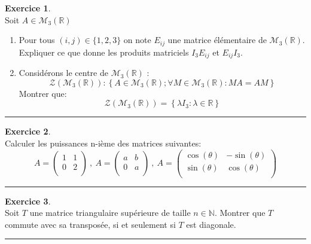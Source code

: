 \documentclass[a4paper,10pt]{article}
\theoremstyle{definition}
\theoremstyle{definition}
\newtheorem{exo}{Exercice}
\newcommand{\R}{\mathbb{R}}
\newcommand{\N}{\mathbb{N}}
\begin{document}
\begin{minipage}{1\linewidth}
\begin{minipage}[t]{0.48\linewidth}
\end{minipage}	
\hfill\vrule\hfill
\begin{minipage}[t]{0.48\linewidth}
\raggedright

\begin{exo}\quad\\
Soit  $A\in\mathcal{M}_{3}\left(\R\right)$ 
\begin{enumerate}
\item Pour tous $(i,j)\in\{1,2,3\}$ on note $E_{ij}$ une matrice élémentaire de $\mathcal{M}_{3}\left(\R\right)$. Expliquer ce que donne les produits matriciels $ I_3E_{ij}$ et $E_{ij}I_3$. 
\item Considérons le centre de $\mathcal{M}_{3}\left(\R\right)$ :
 $$ \mathcal{Z}\left(\mathcal{M}_{3}\left(\R\right)\right) : \left\{A\in\mathcal{M}_{3}\left(\R\right); \forall M\in\mathcal{M}_{3}\left(\R\right)  : MA  = AM \right \}$$
 Montrer que: 
 $$\mathcal{Z}\left(\mathcal{M}_{3}\left(\R\right)\right) = \left\{\lambda I_3 : \lambda\in\R \right \}$$
 
\end{enumerate}
\centering
\rule{1\linewidth}{0.6pt}
\end{exo}

\begin{exo}\quad\\
Calculer les puissances n-ième des matrices suivantes: $$A  =  \begin{pmatrix}
1 & 1 \\
0 &  2\\

\end{pmatrix} \ , \ A  =  \begin{pmatrix}
a & b \\
0 &  a\\

\end{pmatrix}  \ , \ A  =  \begin{pmatrix}
\cos(\theta) & -\sin(\theta)  \\
\sin(\theta) &  \cos(\theta) \\

\end{pmatrix}
$$


\centering\rule{1\linewidth}{0.6pt}
\end{exo}

\begin{exo}\quad\\
Soit $T$ une matrice triangulaire supérieure de taille $n\in\N$. Montrer que $T$ commute avec sa transposée, si et seulement si $T$ est diagonale.

\centering\rule{1\linewidth}{0.6pt}
\end{exo}






\end{minipage}
\end{minipage}
\newpage
\end{document}
